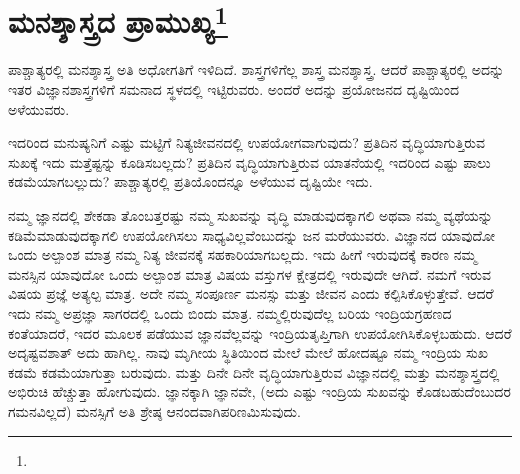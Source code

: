 
\chapter[ಮನಶ್ಶಾಸ್ತ್ರದ ಪ್ರಾಮುಖ್ಯ]{ಮನಶ್ಶಾಸ್ತ್ರದ ಪ್ರಾಮುಖ್ಯ\protect\footnote{}}

ಪಾಶ್ಚಾತ್ಯರಲ್ಲಿ ಮನಶ್ಶಾಸ್ತ್ರ ಅತಿ ಅಧೋಗತಿಗೆ ಇಳಿದಿದೆ. ಶಾಸ್ತ್ರಗಳಿಗೆಲ್ಲ ಶಾಸ್ತ್ರ ಮನಶ್ಶಾಸ್ತ್ರ. ಆದರೆ ಪಾಶ್ಚಾತ್ಯರಲ್ಲಿ ಅದನ್ನು ಇತರ ವಿಜ್ಞಾನಶಾಸ್ತ್ರಗಳಿಗೆ ಸಮನಾದ ಸ್ಥಳದಲ್ಲಿ ಇಟ್ಟಿರುವರು. ಅಂದರೆ ಅದನ್ನು ಪ್ರಯೋಜನದ ದೃಷ್ಟಿಯಿಂದ ಅಳೆಯುವರು.

ಇದರಿಂದ ಮನುಷ್ಯನಿಗೆ ಎಷ್ಟು ಮಟ್ಟಿಗೆ ನಿತ್ಯಜೀವನದಲ್ಲಿ ಉಪಯೋಗವಾಗುವುದು? ಪ್ರತಿದಿನ ವೃದ್ಧಿಯಾಗುತ್ತಿರುವ ಸುಖಕ್ಕೆ ಇದು ಮತ್ತೆಷ್ಟನ್ನು ಕೂಡಿಸಬಲ್ಲದು? ಪ್ರತಿದಿನ ವೃದ್ಧಿಯಾಗುತ್ತಿರುವ ಯಾತನೆಯಲ್ಲಿ ಇದರಿಂದ ಎಷ್ಟು ಪಾಲು ಕಡಮೆಯಾಗಬಲ್ಲುದು? ಪಾಶ್ಚಾತ್ಯರಲ್ಲಿ ಪ್ರತಿಯೊಂದನ್ನೂ ಅಳೆಯುವ ದೃಷ್ಟಿಯೇ ಇದು.

ನಮ್ಮ ಜ್ಞಾನದಲ್ಲಿ ಶೇಕಡಾ ತೊಂಬತ್ತರಷ್ಟು ನಮ್ಮ ಸುಖವನ್ನು ವೃದ್ಧಿ ಮಾಡುವುದಕ್ಕಾಗಲಿ ಅಥವಾ ನಮ್ಮ ವ್ಯಥೆಯನ್ನು ಕಡಿಮೆಮಾಡುವುದಕ್ಕಾಗಲಿ ಉಪಯೋಗಿಸಲು ಸಾಧ್ಯವಿಲ್ಲವೆಂಬುದನ್ನು ಜನ ಮರೆಯುವರು. ವಿಜ್ಞಾನದ ಯಾವುದೋ ಒಂದು ಅಲ್ಪಾಂಶ ಮಾತ್ರ ನಮ್ಮ ನಿತ್ಯ ಜೀವನಕ್ಕೆ ಸಹಕಾರಿಯಾಗಬಲ್ಲದು. ಇದು ಹೀಗೆ ಇರುವುದಕ್ಕೆ ಕಾರಣ ನಮ್ಮ ಮನಸ್ಸಿನ ಯಾವುದೋ ಒಂದು ಅಲ್ಪಾಂಶ ಮಾತ್ರ ವಿಷಯ ವಸ್ತುಗಳ ಕ್ಷೇತ್ರದಲ್ಲಿ ಇರುವುದೇ ಆಗಿದೆ. ನಮಗೆ ಇರುವ ವಿಷಯ ಪ್ರಜ್ಞೆ ಅತ್ಯಲ್ಪ ಮಾತ್ರ. ಅದೇ ನಮ್ಮ ಸಂಪೂರ್ಣ ಮನಸ್ಸು ಮತ್ತು ಜೀವನ ಎಂದು ಕಲ್ಪಿಸಿಕೊಳ್ಳುತ್ತೇವೆ. ಆದರೆ ಇದು ನಮ್ಮ ಅಪ್ರಜ್ಞಾ ಸಾಗರದಲ್ಲಿ ಒಂದು ಬಿಂದು ಮಾತ್ರ. ನಮ್ಮಲ್ಲಿರುವುದೆಲ್ಲ ಬರಿಯ ಇಂದ್ರಿಯಗ್ರಹಣದ ಕಂತೆಯಾದರೆ, ಇದರ ಮೂಲಕ ಪಡೆಯುವ ಜ್ಞಾನವೆಲ್ಲವನ್ನು ಇಂದ್ರಿಯತೃಪ್ತಿಗಾಗಿ ಉಪಯೋಗಿಸಿಕೊಳ್ಳಬಹುದು. ಆದರೆ ಅದೃಷ್ಟವಶಾತ್ ಅದು ಹಾಗಿಲ್ಲ. ನಾವು ಮೃಗೀಯ ಸ್ಥಿತಿಯಿಂದ ಮೇಲೆ ಮೇಲೆ ಹೋದಷ್ಟೂ ನಮ್ಮ ಇಂದ್ರಿಯ ಸುಖ ಕಡಮೆ ಕಡಮೆಯಾಗುತ್ತಾ ಬರುವುದು. ಮತ್ತು ದಿನೇ ದಿನೇ ವೃದ್ಧಿಯಾಗುತ್ತಿರುವ ವಿಜ್ಞಾನದಲ್ಲಿ ಮತ್ತು ಮನಶ್ಶಾಸ್ತ್ರದಲ್ಲಿ ಅಭಿರುಚಿ ಹೆಚ್ಚುತ್ತಾ ಹೋಗುವುದು. ಜ್ಞಾನಕ್ಕಾಗಿ ಜ್ಞಾನವೇ, (ಅದು ಎಷ್ಟು ಇಂದ್ರಿಯ ಸುಖವನ್ನು ಕೊಡಬಹುದೆಂಬುದರ ಗಮನವಿಲ್ಲದೆ) ಮನಸ್ಸಿಗೆ ಅತಿ ಶ್ರೇಷ್ಠ ಆನಂದವಾಗಿ\break ಪರಿಣಮಿಸುವುದು.

